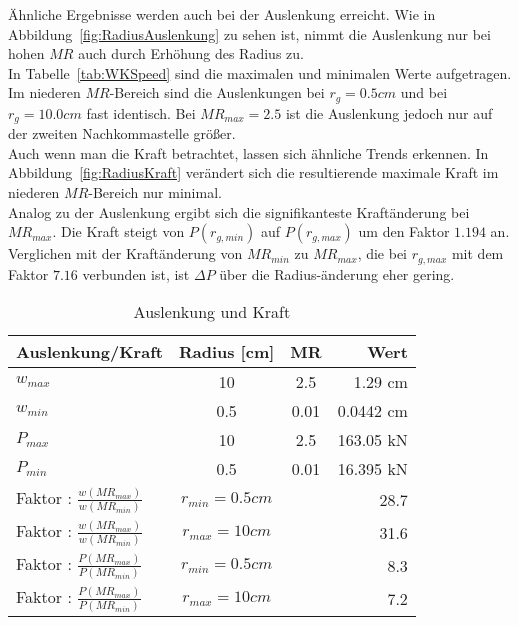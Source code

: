 Ähnliche Ergebnisse werden auch bei der Auslenkung erreicht. Wie in Abbildung~\ref{fig:RadiusAuslenkung} zu sehen ist, nimmt die Auslenkung nur bei hohen $MR$ auch durch Erhöhung des Radius zu.\\
In Tabelle~\ref{tab:WKSpeed} sind die maximalen und minimalen Werte aufgetragen.\\
Im niederen $MR$-Bereich sind die Auslenkungen bei $r_{g} = 0.5 cm$ und bei $r_{g} = 10.0 cm$ fast identisch.  Bei $MR_{max} = 2.5$ ist die Auslenkung jedoch nur auf der zweiten Nachkommastelle größer.\\
Auch wenn man die Kraft betrachtet, lassen sich ähnliche Trends erkennen. In Abbildung~\ref{fig:RadiusKraft} verändert sich die resultierende maximale Kraft im niederen $MR$-Bereich nur minimal.\\
Analog zu der Auslenkung ergibt sich die signifikanteste Kraftänderung bei $MR_{max}$. Die Kraft steigt von $P(r_{g,min})$ auf $P(r_{g,max})$ um den Faktor $1.194$ an. Verglichen mit der Kraftänderung von $MR_{min}$ zu $MR_{max}$, die bei $r_{g,max}$ mit dem Faktor $7.16$ verbunden ist, ist $\Delta P$ über die Radius-änderung eher gering. 

\begin{table}[H]
	\begin{center}
		\caption{Auslenkung und Kraft}
		\label{tab:WKRadius}
		\begin{tabular}{l|c|c|r}
			\textbf{Auslenkung/Kraft} & \textbf{Radius [cm]} & \textbf{MR} & \textbf{Wert}\\
			\hline
			$w_{max}$ & 10 & 2.5 & 1.29 cm\\
			$w_{min}$ & 0.5 & 0.01 & 0.0442 cm\\
			\hline
			$P_{max}$ & 10 & 2.5 & 163.05 kN\\
			$P_{min}$ & 0.5 & 0.01 & 16.395 kN\\
			\hline
			Faktor : $\frac{w(MR_{max})}{w(MR_{min})}$ & $r_{min}=0.5 cm$ & & 28.7\\
			Faktor : $\frac{w(MR_{max})}{w(MR_{min})}$ & $r_{max}=10 cm$ & & 31.6\\
			\hline
			Faktor : $\frac{P(MR_{max})}{P(MR_{min})}$ & $r_{min}=0.5 cm$ & & 8.3\\
			Faktor : $\frac{P(MR_{max})}{P(MR_{min})}$ & $r_{max}=10 cm$ & & 7.2\\
		\end{tabular}
	\end{center}
\end{table}

